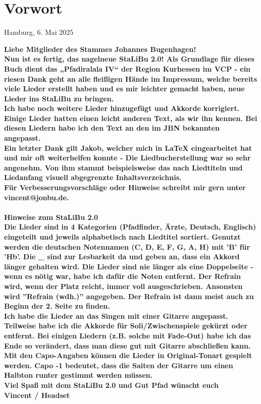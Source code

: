 \section*{Vorwort}

\begin{flushright}
    Hamburg, 6. Mai 2025
\end{flushright}


\bf Liebe Mitglieder des Stammes Johannes Bugenhagen! \sf \\

Nun ist es fertig, das nagelneue StaLiBu 2.0! Als Grundlage für dieses Buch dient das „Pfadiralala IV“ der Region Kurhessen im VCP - ein riesen Dank geht an alle fleißigen Hände im Impressum, welche bereits viele Lieder erstellt haben und es mir leichter gemacht haben, neue Lieder ins StaLiBu zu bringen. \\

Ich habe noch weitere Lieder hinzugefügt und Akkorde korrigiert. Einige Lieder hatten einen leicht anderen Text, als wir ihn kennen. Bei diesen Liedern habe ich den Text an den im JBN bekannten angepasst. \\

Ein letzter Dank gilt Jakob, welcher mich in LaTeX eingearbeitet hat und mir oft weiterhelfen konnte - Die Liedbucherstellung war so sehr angenehm. Von ihm stammt beispielsweise das nach Liedtiteln und Liedanfang visuell abgegrenzte Inhaltsverzeichnis. \\

Für Verbesserungsvorschläge oder Hinweise schreibt mir gern unter vincent@jonbu.de. \\ \\

\bf Hinweise zum StaLiBu 2.0 \sf \\

Die Lieder sind in 4 Kategorien (Pfadfinder, Ärzte, Deutsch, Englisch) eingeteilt und jeweils alphabetisch nach Liedtitel sortiert. Genutzt werden die deutschen Notennamen (C, D, E, F, G, A, H) mit 'B' für 'Hb'. \newline
Die \_ sind zur Lesbarkeit da und geben an, dass ein Akkord länger gehalten wird. Die Lieder sind nie länger als eine Doppelseite - wenn es nötig war, habe ich dafür die Noten entfernt. Der Refrain wird, wenn der Platz reicht, immer voll ausgeschrieben. Ansonsten wird ''Refrain (wdh.)'' angegeben. Der Refrain ist dann meist auch zu Beginn der 2. Seite zu finden. \\

Ich habe die Lieder an das Singen mit einer Gitarre angepasst. Teilweise habe ich die Akkorde für Soli/Zwischenspiele gekürzt oder entfernt. Bei einigen Liedern (z.B. solche mit Fade-Out) habe ich das Ende so verändert, dass man diese gut mit Gitarre abschließen kann.
Mit den Capo-Angaben können die Lieder in Original-Tonart gespielt werden. Capo -1 bedeutet, dass die Saiten der Gitarre um einen Halbton runter gestimmt werden müssen. \\

Viel Spaß mit dem StaLiBu 2.0 und Gut Pfad wünscht euch\\
Vincent / Headset